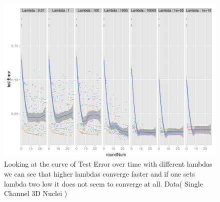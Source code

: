 \begin{figure}
  \centering
  \includegraphics[width=1.0\textwidth]{images/testLoss_nuclei_equalScale.png}
  \caption{  Looking at the curve of Test Error over time with different lambdas we can see that higher lambdas converge faster and if one sets lambda two low it does not seem to converge at all. Data( Single Channel 3D Nuclei \cite{ucsbData})} 
  \label{fig:lambdaTestNucl2}
\end{figure}


